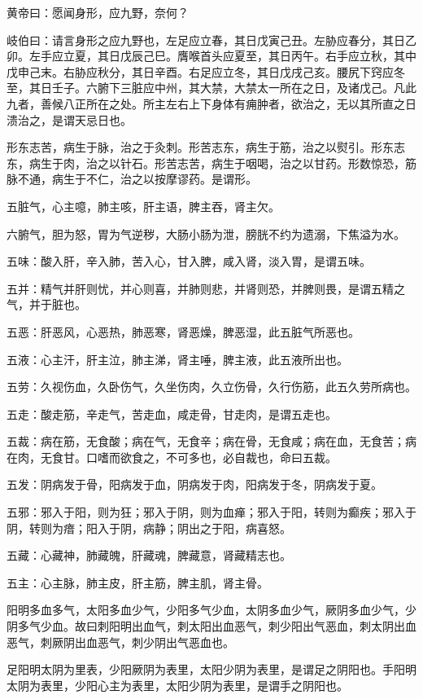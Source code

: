\documentclass[a4paper,12pt,UTF8,twoside]{ctexbook}
\begin{document}
	黄帝曰：愿闻身形，应九野，奈何？
	
	岐伯曰：请言身形之应九野也，左足应立春，其日戊寅己丑。左胁应春分，其日乙卯。左手应立夏，其日戊辰己巳。膺喉首头应夏至，其日丙午。右手应立秋，其中戊申己末。右胁应秋分，其日辛酉。右足应立冬，其日戊戌己亥。腰尻下窍应冬至，其日壬子。六腑下三脏应中州，其大禁，大禁太一所在之日，及诸戊己。凡此九者，善候八正所在之处。所主左右上下身体有痈肿者，欲治之，无以其所直之日溃治之，是谓天忌日也。
	
	形东志苦，病生于脉，治之于灸刺。形苦志东，病生于筋，治之以熨引。形东志东，病生于肉，治之以针石。形苦志苦，病生于咽喝，治之以甘药。形数惊恐，筋脉不通，病生于不仁，治之以按摩谬药。是谓形。
	
	五脏气，心主噫，肺主咳，肝主语，脾主吞，肾主欠。
	
	六腑气，胆为怒，胃为气逆秽，大肠小肠为泄，膀胱不约为遗溺，下焦溢为水。
	
	五味：酸入肝，辛入肺，苦入心，甘入脾，咸入肾，淡入胃，是谓五味。
	
	五并：精气并肝则忧，并心则喜，并肺则悲，并肾则恐，并脾则畏，是谓五精之气，并于脏也。
	
	五恶：肝恶风，心恶热，肺恶寒，肾恶燥，脾恶湿，此五脏气所恶也。
	
	五液：心主汗，肝主泣，肺主涕，肾主唾，脾主液，此五液所出也。
	
	五劳：久视伤血，久卧伤气，久坐伤肉，久立伤骨，久行伤筋，此五久劳所病也。
	
	五走：酸走筋，辛走气，苦走血，咸走骨，甘走肉，是谓五走也。
	
	五裁：病在筋，无食酸；病在气，无食辛；病在骨，无食咸；病在血，无食苦；病在肉，无食甘。口嗜而欲食之，不可多也，必自裁也，命曰五裁。
	
	五发：阴病发于骨，阳病发于血，阴病发于肉，阳病发于冬，阴病发于夏。
	
	五邪：邪入于阳，则为狂；邪入于阴，则为血瘅；邪入于阳，转则为癫疾；邪入于阴，转则为瘖；阳入于阴，病静；阴出之于阳，病喜怒。
	
	五藏：心藏神，肺藏魄，肝藏魂，脾藏意，肾藏精志也。
	
	五主：心主脉，肺主皮，肝主筋，脾主肌，肾主骨。
	
	阳明多血多气，太阳多血少气，少阳多气少血，太阴多血少气，厥阴多血少气，少阴多气少血。故曰刺阳明出血气，刺太阳出血恶气，刺少阳出气恶血，刺太阴出血恶气，刺厥阴出血恶气，刺少阴出气恶血也。
	
	足阳明太阴为里表，少阳厥阴为表里，太阳少阴为表里，是谓足之阴阳也。手阳明太阴为表里，少阳心主为表里，太阳少阴为表里，是谓手之阴阳也。
	
\end{document}
